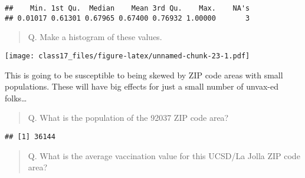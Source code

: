 \documentclass[
]{article}
\newenvironment{Shaded}{\begin{snugshade}}{\end{snugshade}}
\newcommand{\AttributeTok}[1]{\textcolor[rgb]{0.77,0.63,0.00}{#1}}
\newcommand{\DecValTok}[1]{\textcolor[rgb]{0.00,0.00,0.81}{#1}}
\newcommand{\FunctionTok}[1]{\textcolor[rgb]{0.00,0.00,0.00}{#1}}
\newcommand{\NormalTok}[1]{#1}
\newcommand{\OtherTok}[1]{\textcolor[rgb]{0.56,0.35,0.01}{#1}}
\newcommand{\SpecialCharTok}[1]{\textcolor[rgb]{0.00,0.00,0.00}{#1}}
\newcommand{\StringTok}[1]{\textcolor[rgb]{0.31,0.60,0.02}{#1}}
\begin{document}
\begin{Shaded}
\end{Shaded}

\begin{verbatim}
##    Min. 1st Qu.  Median    Mean 3rd Qu.    Max.    NA's 
## 0.01017 0.61301 0.67965 0.67400 0.76932 1.00000       3
\end{verbatim}

\begin{quote}
Q. Make a histogram of these values.
\end{quote}

\begin{Shaded}
\end{Shaded}

\texttt{[image: class17\_files/figure-latex/unnamed-chunk-23-1.pdf]}

This is going to be susceptible to being skewed by ZIP code areas with
small populations. These will have big effects for just a small number
of unvax-ed folks\ldots{}

\begin{quote}
Q. What is the population of the 92037 ZIP code area?
\end{quote}

\begin{Shaded}
\end{Shaded}

\begin{verbatim}
## [1] 36144
\end{verbatim}

\begin{quote}
Q. What is the average vaccination value for this UCSD/La Jolla ZIP code
area?
\end{quote}
\end{document}
